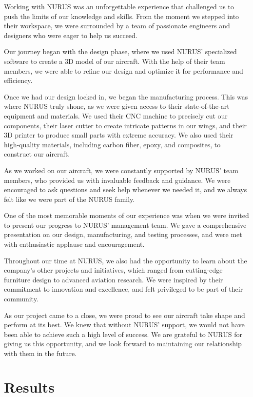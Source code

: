 \documentclass{article}
\begin{document}
Working with NURUS was an unforgettable experience that challenged us to push the limits of our knowledge and skills. From the moment we stepped into their workspace, we were surrounded by a team of passionate engineers and designers who were eager to help us succeed.

Our journey began with the design phase, where we used NURUS' specialized software to create a 3D model of our aircraft. With the help of their team members, we were able to refine our design and optimize it for performance and efficiency.

Once we had our design locked in, we began the manufacturing process. This was where NURUS truly shone, as we were given access to their state-of-the-art equipment and materials. We used their CNC machine to precisely cut our components, their laser cutter to create intricate patterns in our wings, and their 3D printer to produce small parts with extreme accuracy. We also used their high-quality materials, including carbon fiber, epoxy, and composites, to construct our aircraft.

As we worked on our aircraft, we were constantly supported by NURUS' team members, who provided us with invaluable feedback and guidance. We were encouraged to ask questions and seek help whenever we needed it, and we always felt like we were part of the NURUS family.

One of the most memorable moments of our experience was when we were invited to present our progress to NURUS' management team. We gave a comprehensive presentation on our design, manufacturing, and testing processes, and were met with enthusiastic applause and encouragement.

Throughout our time at NURUS, we also had the opportunity to learn about the company's other projects and initiatives, which ranged from cutting-edge furniture design to advanced aviation research. We were inspired by their commitment to innovation and excellence, and felt privileged to be part of their community.

As our project came to a close, we were proud to see our aircraft take shape and perform at its best. We knew that without NURUS' support, we would not have been able to achieve such a high level of success. We are grateful to NURUS for giving us this opportunity, and we look forward to maintaining our relationship with them in the future.

\section{Results}
\end{document}
